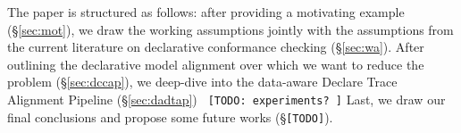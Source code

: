 The paper is structured as follows: after providing a motivating example (\S\ref{sec:mot}), we draw the working assumptions jointly with the assumptions from the current literature on declarative conformance checking (\S\ref{sec:wa}). After outlining the declarative model alignment over which we want to reduce the problem (\S\ref{sec:dccap}), we deep-dive into the data-aware Declare Trace Alignment Pipeline (\S\ref{sec:dadtap}) \texttt{\color{red} [TODO: experiments? ]} Last, we draw our final conclusions and propose some future works (\S\texttt{\color{red}[TODO]}). 